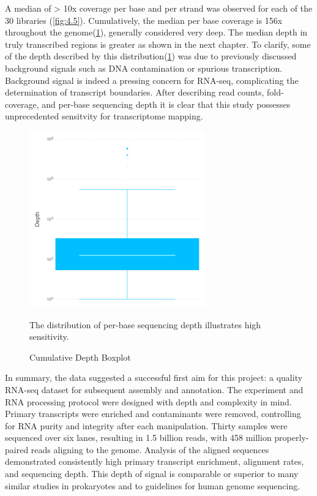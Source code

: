A median of > 10x coverage per base and per strand was observed for each of the 30 libraries (\ref{fig:4.5}). Cumulatively, the median per base coverage is 156x throughout the genome(\ref{fig:4.6}), generally considered very deep. The median depth in truly transcribed regions is greater as shown in the next chapter. To clarify, some of the depth described by this distribution(\ref{fig:4.6}) was due to previously discussed background signals such as DNA contamination\cite{176} or spurious transcription.\cite{164,165} Background signal is indeed a pressing concern for RNA-seq,\cite{110,176,57} complicating the determination of transcript boundaries. After describing read counts, fold-coverage, and per-base sequencing depth it is clear that this study possesses unprecedented sensitvity for transcriptome mapping.

\begin{figure}
\small
\vspace{-20pt}
\begin{center}
{\includegraphics[width=\linewidth,height=3in]{images/Sequencing/Cumulative_depth_boxplot.png}}
\caption{Cumulative Depth Boxplot}\label{fig:4.6}
The distribution of per-base sequencing depth illustrates high sensitivity.
\end{center}
\vspace{-20pt}
\end{figure}


In summary, the data suggested a successful first aim for this project: a quality RNA-seq dataset for subsequent assembly and annotation. The experiment and RNA processing protocol were designed with depth and complexity in mind. Primary transcripts were enriched and contaminants were removed, controlling for RNA purity and integrity after each manipulation. Thirty samples were sequenced over six lanes, resulting in 1.5 billion reads, with 458 million properly-paired reads aligning to the genome. Analysis of the aligned sequences demonstrated consistently high primary transcript enrichment, alignment rates, and sequencing depth. This depth of signal is comparable or superior to many similar studies in prokaryotes and to guidelines for human genome sequencing.



